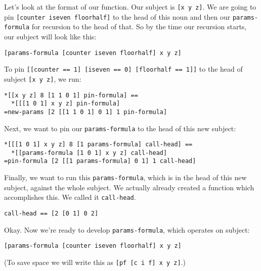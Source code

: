 \documentclass[twoside]{article}
\begin{document}
Let's look at the format of our function. Our subject is \lstinline[style=inlinecode]{[x y z]}. We are going to pin \lstinline[style=inlinecode]{[counter iseven floorhalf]} to the head of this noun and then our \lstinline[style=inlinecode]{params-formula} for recursion to the head of that. So by the time our recursion starts, our subject will look like this:

\begin{lstlisting}[style=listingblock]
[params-formula [counter iseven floorhalf] x y z]
\end{lstlisting}

To pin \lstinline[style=inlinecode]{[[counter == 1] [iseven == 0] [floorhalf == 1]]} to the head of subject \lstinline[style=inlinecode]{[x y z]}, we run:

\begin{lstlisting}[style=listingblock]
*[[x y z] 8 [1 1 0 1] pin-formula] ==
  *[[[1 0 1] x y z] pin-formula]
=new-params [2 [[1 1 0 1] 0 1] 1 pin-formula]
\end{lstlisting}

Next, we want to pin our \lstinline[style=inlinecode]{params-formula} to the head of this new subject:

\begin{lstlisting}[style=listingblock]
*[[[1 0 1] x y z] 8 [1 params-formula] call-head] ==
  *[[params-formula [1 0 1] x y z] call-head]
=pin-formula [2 [[1 params-formula] 0 1] 1 call-head]
\end{lstlisting}

Finally, we want to run this \lstinline[style=inlinecode]{params-formula}, which is in the head of this new subject, against the whole subject. We actually already created a function which accomplishes this. We called it \lstinline[style=inlinecode]{call-head}.

\begin{lstlisting}[style=listingblock]
call-head == [2 [0 1] 0 2]
\end{lstlisting}

Okay. Now we're ready to develop \lstinline[style=inlinecode]{params-formula}, which operates on subject:

\begin{lstlisting}[style=listingblock]
[params-formula [counter iseven floorhalf] x y z]
\end{lstlisting}

(To save space we will write this as \lstinline[style=inlinecode]{[pf [c i f] x y z]}.)
\end{document}
